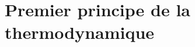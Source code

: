 \documentclass[../main/main.tex]{subfiles}
\begin{document}
\setcounter{chapter}{1}

\chapter{Premier principe de la thermodynamique}
\end{document}

